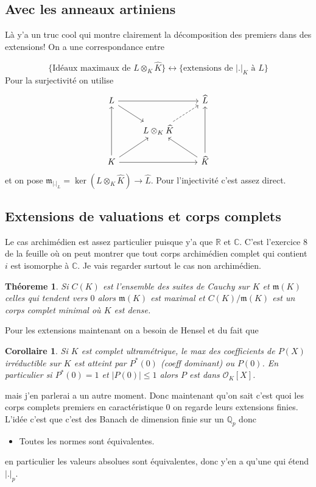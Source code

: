 \documentclass[a4paper,12pt]{book}
\newcommand{\R}{\mathbb{R}}
\newcommand{\Q}{\mathbb{Q}}
\newcommand{\C}{\mathbb{C}}
\newcommand{\Or}{\mathcal{O}}
\newcommand{\m}{\mathfrak m}
\theoremstyle{plain}
\newtheorem{thm}{Théoreme}
\newtheorem{cor}{Corollaire}
\theoremstyle{definition}
\theoremstyle{remark}
\begin{document}
\subsection{Avec les anneaux artiniens}
Là y'a un truc cool qui montre clairement la décomposition des premiers
dans des extensions! On a une correspondance entre 


\[\{\textrm{Idéaux maximaux de }L\otimes_K\widehat K\}\leftrightarrow\{\textrm{extensions de $|.|_K$ à $L$}\}\]
Pour la surjectivité on utilise %
\[\begin{tikzcd}
	L && {\widehat L} \\
	& {L\otimes_K \widehat K} \\
	K && {\widehat K}
	\arrow[from=1-1, to=1-3]
	\arrow[from=1-1, to=2-2]
	\arrow[dashed, from=2-2, to=1-3]
	\arrow[from=3-1, to=1-1]
	\arrow[from=3-1, to=2-2]
	\arrow[from=3-1, to=3-3]
	\arrow[from=3-3, to=1-3]
	\arrow[from=3-3, to=2-2]
\end{tikzcd}\]
et on pose $\m_{|.|_L}=\ker(L\otimes_K \widehat K)\to \widehat L$. Pour
l'injectivité c'est assez direct.

\subsection{Extensions de valuations et corps complets}
Le cas archimédien est assez particulier puisque y'a que $\R$ et $\C$.
C'est l'exercice $8$ de la feuille où on peut montrer que tout corps
archimédien complet qui contient $i$ est isomorphe à $\C$. Je
vais regarder surtout le cas non archimédien.
\begin{thm}
    Si $C(K)$ est l'ensemble des suites de Cauchy sur $K$ et $\m(K)$
    celles qui tendent vers $0$ alors $\m(K)$ est maximal et
    $C(K)/\m(K)$ est un corps complet minimal où $K$ est dense.
\end{thm}
Pour les extensions maintenant on a besoin de Hensel et du fait que
\begin{cor}
    Si $K$ est complet ultramétrique, le max des coefficients de $P(X)$
    irréductible sur $K$ est atteint par $P^*(0)$ (coeff dominant)
    ou $P(0)$. En particulier si $P^*(0)=1$ et $|P(0)|\leq 1$ alors
    $P$ est dans $\Or_K[X]$.
\end{cor}
mais j'en parlerai a un autre moment. Donc maintenant qu'on sait c'est
quoi les corps complets premiers en caractéristique $0$ on regarde
leurs extensions finies. L'idée c'est que c'est des Banach de dimension
finie sur un $\Q_p$ donc
\begin{itemize}
    \item Toutes les normes sont équivalentes.
\end{itemize}
en particulier les valeurs absolues sont équivalentes, donc y'en a 
qu'une qui étend $|.|_p$.
\end{document}
